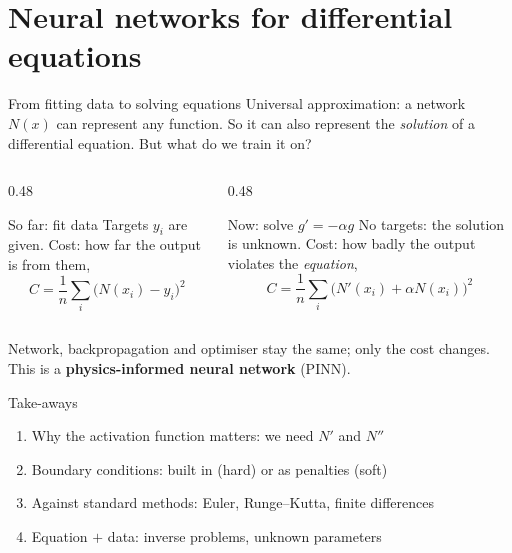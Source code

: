 \documentclass[10pt,aspectratio=169]{beamer}
\begin{document}

\section{Neural networks for differential equations}

\begin{frame}{From fitting data to solving equations}
\small
Universal approximation: a network $N(x)$ can represent any function.  So
it can also represent the \emph{solution} of a differential equation.
But what do we train it on?
\vspace{0pt}
\begin{columns}[T]
\begin{column}{0.48\textwidth}
\begin{block}{So far: fit data}
Targets $y_i$ are given.  Cost: how far the output is from them,
\[
  C=\frac1n\sum_i\bigl(N(x_i)-y_i\bigr)^{2}
\]
\end{block}
\end{column}
\begin{column}{0.48\textwidth}
\begin{block}{Now: solve $g'=-\alpha g$}
No targets: the solution is unknown.  Cost: how badly the output violates
the \emph{equation},
\[
  C=\frac1n\sum_i\bigl(N'(x_i)+\alpha N(x_i)\bigr)^{2}
\]
\end{block}
\end{column}
\end{columns}
Network, backpropagation and optimiser stay the same; only the cost
changes.  This is a \textbf{physics-informed neural network} (PINN).
\begin{block}{Take-aways}
\begin{enumerate}\setlength{\itemsep}{0pt}
  \item Why the activation function matters: we need $N'$ and $N''$
  \item Boundary conditions: built in (hard) or as penalties (soft)
  \item Against standard methods: Euler, Runge--Kutta, finite differences
  \item Equation $+$ data: inverse problems, unknown parameters
\end{enumerate}
\end{block}
\end{frame}
\end{document}
